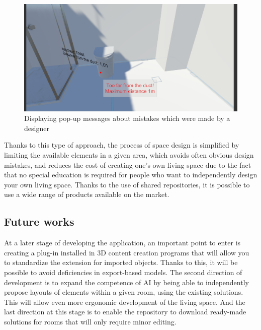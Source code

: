 \documentclass[runningheads]{llncs}
\begin{document}
\begin{figure}[H]
\centering
\includegraphics[width=\textwidth]{aplikacja3.png}
\caption{Displaying pop-up messages about mistakes which were made by a designer} \label{fig8}
\end{figure}

Thanks to this type of approach, the process of space design is simplified by limiting the available elements in a given area, which avoids often obvious design mistakes, and reduces the cost of creating one's own living space due to the fact that no special education is required for people who want to independently design your own living space. Thanks to the use of shared repositories, it is possible to use a wide range of products available on the market.

\subsection{Future works}
At a later stage of developing the application, an important point to enter is creating a plug-in installed in 3D content creation programs that will allow you to standardize the extension for imported objects. Thanks to this, it will be possible to avoid deficiencies in export-based models. The second direction of development is to expand the competence of AI by being able to independently propose layouts of elements within a given room, using the existing solutions. This will allow even more ergonomic development of the living space. And the last direction at this stage is to enable the repository to download ready-made solutions for rooms that will only require minor editing.
\end{document}
